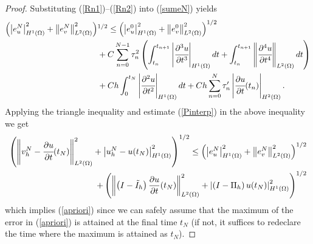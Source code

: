 \documentclass{imanum}
\begin{document}
\begin{proof}
Substituting (\ref{Rn1})--(\ref{Rn2}) into (\ref{sumeN}) yields
\begin{align*}
\left(\left|e^N_u \right|_{H^1(\Omega)}^2  +\left\|e^N_v\right\|_{L^2(\Omega)}^2\right)&^{1/2} \leq
 \left(\left|e^0_u\right|_{H^1(\Omega)}^2 +\left\|e^0_v \right\|_{L^2(\Omega)}^2\right)^{1/2} \\
 &+ C \sum_{n = 0}^{N - 1} \tau^2_n  \left(
   \int_{t_n}^{t_{n + 1}} \left\vert \cfrac{\partial^3
   u}{\partial t^3} \right\vert_{H^1(\Omega)} dt  + \int_{t_n}^{t_{n + 1}} \left\Vert \cfrac{\partial^4
   u}{\partial t^4} \right\Vert_{L^2(\Omega)} dt \right) \\
   & + Ch \int_0^{t_N}  \left\vert \cfrac{\partial^2 u}{\partial t^2} \right\vert_{H^1(\Omega)} dt
    + Ch \sum_{n=0}^{N}  \tau_n'\left\vert \cfrac{\partial u}{\partial t} (t_n)\right\vert_{H^2(\Omega)}. 
\end{align*}
Applying the triangle inequality and estimate (\ref{Pinterp}) in the above inequality we get
\begin{align}
\left(\left\Vert v^N_h - \cfrac{\partial u}{\partial t} (t_N) \right\Vert_{L^2(\Omega)}^2 + \left|u^N_h - u (t_N) \right|^2_{H^1(\Omega)}\right)^{1/2} \leq \left(\left|e^N_u\right|_{H^1(\Omega)}^2 +\left\|e^N_v \right\|_{L^2(\Omega)}^2\right)^{1/2}& \notag\\+
   \left(\left\Vert \left(I-\tilde I_h\right) \frac{\partial u}{\partial t} (t_N)\right\Vert_{L^2(\Omega)}^2 + \left\vert \left(I-\Pi_h\right) u (t_N) \right\vert^2_{H^1(\Omega)}\right)^{1/2}&
\end{align}
which implies (\ref{apriori}) since we can safely assume that the maximum of the error in (\ref{apriori}) is attained at the final time $t_N$ (if not, it suffices to redeclare the time where the maximum is attained as $t_N$).
\end{proof}
\end{document}
